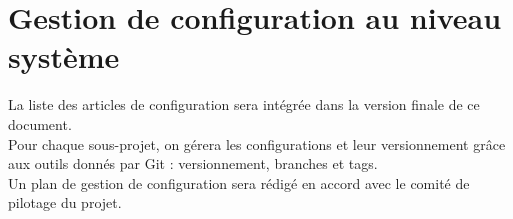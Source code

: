 \section{Gestion de configuration au niveau système}

La liste des articles de configuration sera intégrée dans la version finale
de ce document.\\

Pour chaque sous-projet, on gérera les configurations et leur versionnement
grâce aux outils donnés par Git : versionnement, branches et tags.\\

Un plan de gestion de configuration sera rédigé en accord avec le comité de
pilotage du projet.
